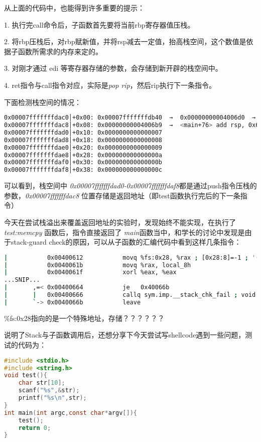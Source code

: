 \documentclass[12pt]{article}  %
\begin{document}
从上面的代码中，也能得到许多重要的提示：\par
1. 执行完call命令后，子函数首先要将当前rbp寄存器值压栈。\par
2. 将rbp压栈后，对rbp赋新值，并将rsp减去一定值，抬高栈空间，这个数值是依据子函数所需求的内存来定的。\par
3. 对刚才通过 edi 等寄存器存储的参数，会存储到新开辟的栈空间中。\par
4. ret指令与call指令对应，实际是\emph{pop rip}，然后rip执行下一条指令。\par
下面检测栈空间的情况：
\begin{lstlisting}[language=sh]
0x00007fffffffdac0│+0x00: 0x00007fffffffdb40  →  0x00000000004006d0  →  <__libc_csu_init+0> push r15	 ← $rsp, $rbp
0x00007fffffffdac8│+0x08: 0x00000000004006b9  →  <main+76> add rsp, 0x60
0x00007fffffffdad0│+0x10: 0x0000000000000007
0x00007fffffffdad8│+0x18: 0x0000000000000008
0x00007fffffffdae0│+0x20: 0x0000000000000009
0x00007fffffffdae8│+0x28: 0x000000000000000a
0x00007fffffffdaf0│+0x30: 0x000000000000000b
0x00007fffffffdaf8│+0x38: 0x000000000000000c
\end{lstlisting}\par
可以看到，栈空间中 \emph{0x00007fffffffdad0-0x00007fffffffdaf8}都是通过push指令压栈的参数，\emph{0x00007fffffffdac8} 位置存储是返回地址（即test函数执行完后的下一条指令）\par
今天在尝试栈溢出来覆盖返回地址的实验时，发现始终不能实现，在执行了\emph{test:memcpy} 函数后，指令直接返回了 \emph{main}函数当中，和学长的讨论中发现是由于stack-guard check的原因，可以从子函数的汇编代码中看到这样几条指令：
\begin{lstlisting}[language=sh]
|           0x00400612           movq %fs:0x28, %rax ; [0x28:8]=-1 ; '(' ; 40
|           0x0040061b           movq %rax, local_8h
|           0x0040061f           xorl %eax, %eax
...SNIP...
|       ,=< 0x00400664           je   0x40066b
|       |   0x00400666           callq sym.imp.__stack_chk_fail ; void __stack_chk_fail(void)
|       `-> 0x0040066b           leave
\end{lstlisting}\par
\%fs:0x28指向的是一个特殊地址，存储？？？？？？ \par
说明了Stack与子函数调用后，还想分享下今天尝试写shellcode遇到一些问题，测试的代码为：
\begin{lstlisting}[language=c]
#include <stdio.h>
#include <string.h>
void test(){
    char str[10];
    scanf("%s",&str);
    printf("%s\n",str);
}
int main(int argc,const char*argv[]){
    test();
    return 0;
}
\end{lstlisting}\par
\end{document}
